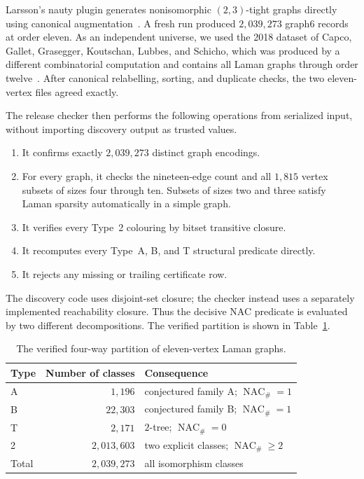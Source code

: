 \documentclass[11pt]{amsart}
\theoremstyle{definition}
\newcommand{\NACnum}{\operatorname{NAC}_{\#}}
\begin{document}
Larsson's nauty plugin generates nonisomorphic $(2,3)$-tight graphs directly
using canonical augmentation~\cite{larsson,nauty2014}.  A fresh run produced
$2{,}039{,}273$ graph6 records at order eleven.  As an independent universe,
we used the 2018 dataset of Capco, Gallet, Grasegger, Koutschan, Lubbes, and
Schicho, which was produced by a different combinatorial computation and
contains all Laman graphs through order twelve~\cite{capco2018data}.  After
canonical relabelling, sorting, and duplicate checks, the two eleven-vertex
files agreed exactly.

The release checker then performs the following operations from serialized
input, without importing discovery output as trusted values.

\begin{enumerate}
\item It confirms exactly $2{,}039{,}273$ distinct graph encodings.
\item For every graph, it checks the nineteen-edge count and all $1{,}815$
vertex subsets of sizes four through ten.  Subsets of sizes two and three
satisfy Laman sparsity automatically in a simple graph.
\item It verifies every Type~2 colouring by bitset transitive closure.
\item It recomputes every Type~A, B, and T structural predicate directly.
\item It rejects any missing or trailing certificate row.
\end{enumerate}

The discovery code uses disjoint-set closure; the checker instead uses a
separately implemented reachability closure.  Thus the decisive NAC predicate
is evaluated by two different decompositions.  The verified partition is
shown in Table~\ref{tab:partition}.

\begin{table}[ht]
\centering
\caption{The verified four-way partition of eleven-vertex Laman graphs.}
\label{tab:partition}
\begin{tabular}{lrl}
\toprule
Type & Number of classes & Consequence \\
\midrule
A & $1{,}196$ & conjectured family A; $\NACnum=1$ \\
B & $22{,}303$ & conjectured family B; $\NACnum=1$ \\
T & $2{,}171$ & $2$-tree; $\NACnum=0$ \\
2 & $2{,}013{,}603$ & two explicit classes; $\NACnum\geq2$ \\
\midrule
Total & $2{,}039{,}273$ & all isomorphism classes \\
\bottomrule
\end{tabular}
\end{table}
\end{document}

